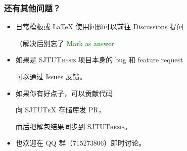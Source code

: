 \begin{frame}

  \frametitle{还有其他问题？}



      \begin{itemize}

        \item[{\faComment*[regular]}] 日常模板或 \LaTeX{} 使用问题可以前往 Discussions  提问

        （解决后别忘了 \textcolor{green}{\faCheckCircle{} Mark as answer}

        \item[{\faDotCircle[regular]}] 如果是 \textsc{SJTUThesis} 项目本身的 bug 和 feature request

        可以通过 Issues  反馈。

        \item[{\faCodeBranch}] 如果你有好点子，可以贡献代码

          向 \textsc{SJTU\TeX{}}  存储库发 PR，\par

          而后把解包结果同步到 \textsc{SJTUThesis}。

        \item[{\faQq}] 也欢迎在 QQ 群（715273806）即时讨论。


      \end{itemize}






\end{frame}

